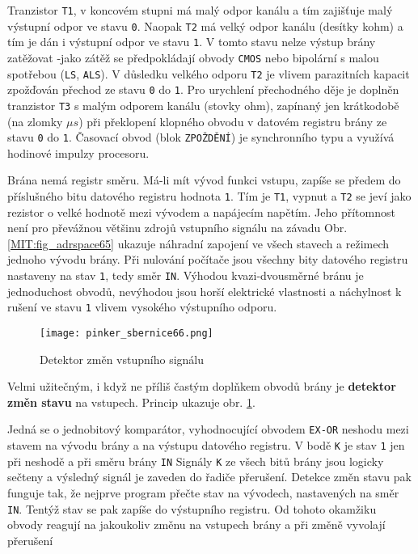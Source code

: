       Tranzistor \texttt{T1}, v koncovém stupni má malý odpor kanálu a tím zajišťuje malý výstupní
      odpor ve stavu \texttt{0}. Naopak \texttt{T2} má velký odpor kanálu (desítky kohm) a tím je
      dán i výstupní odpor ve stavu \texttt{1}. V tomto stavu nelze výstup brány zatěžovat -jako
      zátěž se předpokládají obvody \texttt{CMOS} nebo bipolární s malou spotřebou (\texttt{LS},
      \texttt{ALS}). V důsledku velkého odporu \texttt{T2} je vlivem parazitních kapacit zpožďován
      přechod ze stavu \texttt{0} do \texttt{1}. Pro urychlení přechodného děje je doplněn
      tranzistor \texttt{T3} s malým odporem kanálu (stovky ohm), zapínaný jen krátkodobě (na zlomky
      \(\mu s\)) při překlopení klopného obvodu v datovém registru brány ze stavu \texttt{0} do
      \texttt{1}. Časovací obvod (blok \texttt{ZPOŽDĚNÍ}) je synchronního typu a využívá hodinové
      impulzy procesoru.
      
      Brána nemá registr směru. Má-li mít vývod funkci vstupu, zapíše se předem do příslušného bitu
      datového registru hodnota \texttt{1}. Tím je \texttt{T1}, vypnut a \texttt{T2} se jeví jako
      rezistor o velké hodnotě mezi vývodem a napájecím napětím. Jeho přítomnost není pro převážnou
      většinu zdrojů vstupního signálu na závadu Obr. \ref{MIT:fig_adrspace65} ukazuje náhradní
      zapojení ve všech stavech a režimech jednoho vývodu brány. Při nulování počítače jsou všechny
      bity datového registru nastaveny na stav \texttt{1}, tedy směr \texttt{IN}. Výhodou
      kvazi-dvousměrné bránu je jednoduchost obvodů, nevýhodou jsou horší elektrické vlastnosti a
      náchylnost k rušení ve stavu \texttt{1} vlivem vysokého výstupního odporu.
      
    \begin{figure}[ht!] %
      \centering
      \texttt{[image: pinker\_sbernice66.png]}
      \caption{Detektor změn vstupního signálu}
      \label{MIT:fig_sbernice66}
    \end{figure}
    
    Velmi užitečným, i když ne příliš častým doplňkem obvodů brány je \textbf{detektor změn stavu}
    na vstupech. Princip ukazuje obr. \ref{MIT:fig_sbernice66}.
     
    Jedná se o jednobitový komparátor, vyhodnocující obvodem \texttt{EX-OR} neshodu mezi stavem na
    vývodu brány a na výstupu datového registru. V bodě \texttt{K} je stav \texttt{1} jen při
    neshodě a při směru brány \texttt{IN} Signály \texttt{K} ze všech bitů brány jsou logicky
    sečteny a výsledný signál je zaveden do řadiče přerušení. Detekce změn stavu pak funguje tak, že
    nejprve program přečte stav na vývodech, nastavených na směr \texttt{IN}. Tentýž stav se pak
    zapíše do výstupního registru. Od tohoto okamžiku obvody reagují na jakoukoliv změnu na vstupech
    brány a při změně vyvolají přerušení
    
